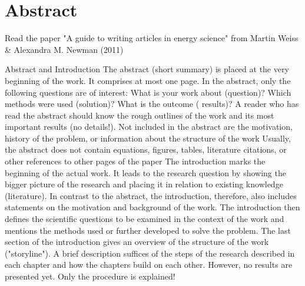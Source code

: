 \section*{Abstract}

Read the paper "A guide to writing articles in energy science" from Martin Weiss \& Alexandra M. Newman (2011)

Abstract and Introduction
The abstract (short summary) is placed at the very beginning of the work. It comprises at most one page.
In the abstract, only the following questions are of interest: What is your work about (question)? Which methods were used (solution)? What is the outcome ( results)?
A reader who has read the abstract should know the rough outlines of the work and its most important results (no details!).
Not included in the abstract are the motivation, history of the problem, or information about the structure of the work
Usually, the abstract does not contain equations, figures, tables, literature citations, or other references to other pages of the paper
The introduction marks the beginning of the actual work. It leads to the research question by showing the bigger picture of the research and placing it in relation to existing knowledge (literature). 
In contrast to the abstract, the introduction, therefore, also includes statements on the motivation and background of the work.
The introduction then defines the scientific questions to be examined in the context of the work and mentions the methods used or further developed to solve the problem.
The last section of the introduction gives an overview of the structure of the work ("storyline"). A brief description suffices of the steps of the research described in each chapter and how the chapters build on each other. However, no results are presented yet. Only the procedure is explained!
